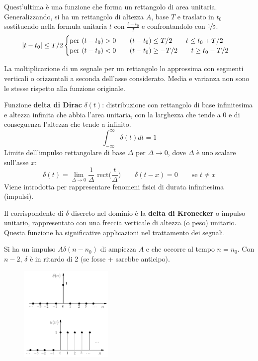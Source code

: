 Quest'ultima è una funzione che forma un rettangolo di area unitaria. Generalizzando, si ha un rettangolo di altezza $A$, base $T$ e traslato in $t_0$ sostituendo nella formula unitaria $t$ con $\frac{t - t_0}{T}$ e confrontandolo con $\nicefrac{1}{2}$.
$$\left|t - t_0\right| \leq T / 2 \begin{cases}
\text{per } (t - t_0) > 0 \qquad (t - t_0) \leq T / 2 \qquad t \leq t_0 + T / 2 \\
\text{per } (t - t_0) < 0 \qquad (t - t_0) \geq -T / 2 \qquad t \geq t_0 - T / 2
\end{cases}$$

La moltiplicazione di un segnale per un rettangolo lo approssima con segmenti verticali o orizzontali a seconda dell'asse considerato. Media e varianza non sono le stesse rispetto alla funzione originale.

Funzione \textbf{delta di Dirac} $\delta(t)$: distribuzione con rettangolo di base infinitesima e altezza infinita che abbia l'area unitaria, con la larghezza che tende a 0 e di conseguenza l'altezza che tende a infinito. 
$$\int_{-\infty}^{\infty} \delta(t) dt = 1$$
Limite dell'impulso rettangolare di base $\Delta$ per $\Delta \rightarrow 0$, dove $\Delta$ è uno scalare sull'asse $x$: 
$$\delta(t) = \lim\limits_{\Delta \rightarrow 0} \frac{1}{\Delta} \text{ rect}\Big(\frac{t}{\Delta}\Big) \qquad \delta(t - x) = 0 \qquad \text{se } t \neq x$$
Viene introdotta per rappresentare fenomeni fisici di durata infinitesima (impulsi).

Il corrispondente di $\delta$ discreto nel dominio è la \textbf{delta di Kronecker} o impulso unitario, rappresentato con una freccia verticale di altezza (o peso) unitario. Questa funzione ha significative applicazioni nel trattamento dei segnali. 

Si ha un impulso $A\delta(n - n_0)$ di ampiezza $A$ e che occorre al tempo $n = n_0$. Con $n - 2$, $\delta$ è in ritardo di 2 (se fosse + sarebbe anticipo).

\begin{figure}
	\begin{center}
		\includegraphics[width=0.4\textwidth]{Lezioni/Immagini/gradinodiscreto}
	\end{center}
\end{figure}

